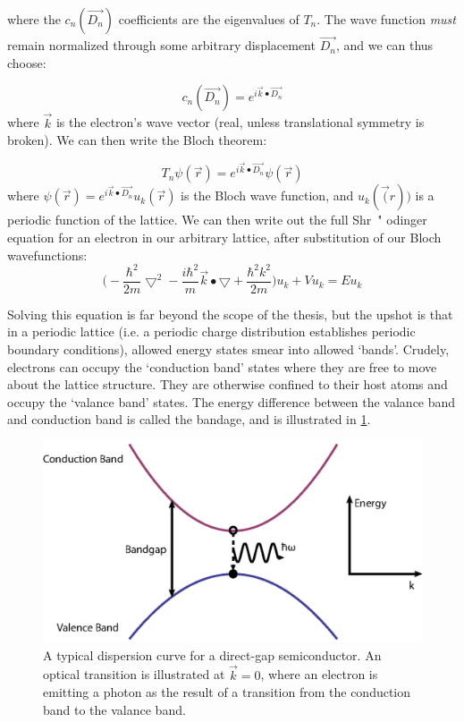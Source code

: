 where the $c_n(\vec{D_n})$ coefficients are the eigenvalues of $T_n$. The wave function \textit{must} remain normalized through some arbitrary displacement $\vec{D_n}$, and we can thus choose:

\begin{equation}
c_n(\vec{D_n}) = e^{i \vec{k} \bullet \vec{D_n}}
\end{equation}
where $\vec{k}$ is the electron's wave vector (real, unless translational symmetry is broken). We can then write the Bloch theorem:

\begin{equation}
T_n \psi(\vec{r}) = e^{i\vec{k} \bullet \vec{D_n}} \psi(\vec{r})
\end{equation}
where $\psi(\vec{r}) = e^{i\vec{k} \bullet \vec{D_n}}u_k(\vec{r})$ is the Bloch wave function, and $u_k(\vec(r))$ is a periodic function of the lattice. We can then write out the full Shr{\ " o}dinger equation for an electron in our arbitrary lattice, after substitution of our Bloch wavefunctions:
\begin{equation}
\Big (-\frac{ \hbar ^2}{2m} \bigtriangledown ^2 - \frac{ i\hbar^2}{m} \vec{k} \bullet \bigtriangledown + \frac{\hbar^2 k^2}{2m} \Big ) u_k + V u_k = E u_k
\end{equation}

Solving this equation is far beyond the scope of the thesis, but the upshot is that in a periodic lattice (i.e. a periodic charge distribution establishes periodic boundary conditions), allowed energy states smear into allowed `bands'. Crudely, electrons can occupy the `conduction band' states where they are free to move about the lattice structure. They are otherwise confined to their host atoms and occupy the `valance band' states. The energy difference between the valance band and conduction band is called the bandage, and is illustrated in \ref{Example band structure of a direct-gap semiconductor.}. 

\begin{figure}[h!]
\centering
\includegraphics[width = .9\textwidth]{dispcurve.eps}
\caption{A typical dispersion curve for a direct-gap semiconductor. An optical transition is illustrated at $\vec{k} = 0$, where an electron is emitting a photon as the result of a transition from the conduction band to the valance band.}
\label{Example band structure of a direct-gap semiconductor.}
\end{figure}

